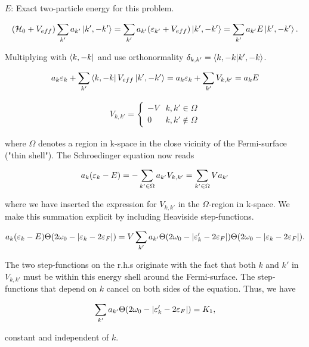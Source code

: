 $E$: Exact two-particle energy for this problem. 

\begin{align*}
(\mathcal{H}_0 + V_{eff})\sum_{k'} a_{k'}\ket{k', -k'} = \sum_{k'} a_{k'}(\varepsilon_{k'} + V_{eff})\ket{k', -k'} = \sum_{k'} a_{k'}E\ket{k', -k'}.
\end{align*}

Multiplying with $\bra{k,-k}$ and use orthonormality $\delta_{k,k'} = \braket{k,-k}{k',-k}$. 

\begin{align*}
a_k \varepsilon_k + \sum_{k'} \bra{k, -k} V_{eff} \ket{k', -k'} = a_k \varepsilon_k + \sum_{k'} V_{k,k'} = a_k E
\end{align*}

\begin{align*}
V_{k,k'} = \begin{cases} -V & k,k' \in \Omega \\
0 & k,k' \notin \Omega \end{cases} 
\end{align*}

where $\Omega$ denotes a region in k-space in the close vicinity of the Fermi-surface ("thin shell"). The Schroedinger equation now reads 

\begin{align*}
a_k(\varepsilon_k - E) = -\sum_{k' \in \Omega}a_{k'}V_{k,k'} = \sum_{k' \in \Omega}V a_{k'}
\end{align*}

where we have inserted the expression for $V_{k,k'}$ in the $\Omega$-region in k-space. We make this summation explicit by including Heaviside step-functions. 

\begin{align*}
a_k (\varepsilon_k - E) \Theta(2\omega_0 - \abs{\varepsilon_k - 2\varepsilon_F}) = V \sum_{k'} a_{k'} \Theta(2\omega_0 - \abs{\varepsilon_k' - 2\varepsilon_F}) \Theta(2\omega_0 - \abs{\varepsilon_k - 2\varepsilon_F}).
\end{align*}

The two step-functions on the r.h.s originate with the fact that both $k$ and $k'$ in $V_{k,k'}$ must be within this energy shell around the Fermi-surface. The step-functions that depend on $k$ cancel on both sides of the equation. Thus, we have 

\begin{align*}
\sum_{k'} a_{k'} \Theta(2\omega_0 - \abs{\varepsilon_k' - 2\varepsilon_F}) = K_1, 
\end{align*}

constant and independent of $k$. 

